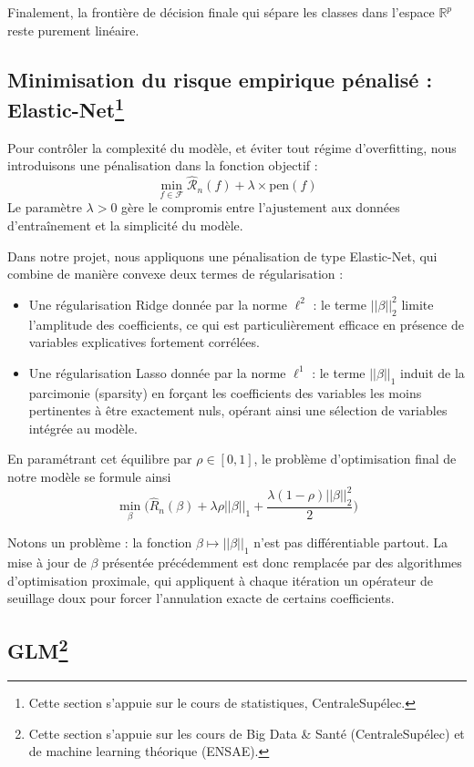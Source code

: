 \documentclass[a4paper,11pt]{paper}
\theoremstyle{plain}
\theoremstyle{definition}
\theoremstyle{remark}
\begin{document}
Finalement, la frontière de décision finale qui sépare les classes dans l'espace $\mathbb{R}^p$ reste purement linéaire.


\subsection{Minimisation du risque empirique pénalisé : Elastic-Net\texorpdfstring{\protect\footnote{Cette section s'appuie sur le cours de statistiques, CentraleSupélec.}}{}}

Pour contrôler la complexité du modèle, et éviter tout régime d'overfitting, nous introduisons une pénalisation dans la fonction objectif :
$$\min_{f \in \mathcal{F}} \hat{\mathcal{R}}_n(f) + \lambda \times \text{pen}(f)$$
Le paramètre $\lambda > 0$ gère le compromis entre l'ajustement aux données d'entraînement et la simplicité du modèle.

Dans notre projet, nous appliquons une pénalisation de type Elastic-Net, qui combine de manière convexe deux termes de régularisation :
\begin{itemize}
    \item Une régularisation Ridge donnée par la norme $\ell^2$ : le terme $||\beta||_2^2$ limite l'amplitude des coefficients, ce qui est particulièrement efficace en présence de variables explicatives fortement corrélées.
    \item Une régularisation Lasso donnée par la norme $\ell^1$ : le  terme $||\beta||_1$ induit de la parcimonie (sparsity) en forçant les coefficients des variables les moins pertinentes à être exactement nuls, opérant ainsi une sélection de variables intégrée au modèle.
\end{itemize}

En paramétrant cet équilibre par $\rho \in [0,1]$, le problème d'optimisation final de notre modèle se formule ainsi
$$\min_{\beta} \bigg( \hat R_n(\beta) + \lambda \rho ||\beta||_1 + \dfrac{\lambda (1- \rho)||\beta||_2^2}{2}\bigg)$$

Notons un problème : la fonction $\beta \mapsto ||\beta||_1$ n'est pas différentiable partout. La mise à jour de $\beta$ présentée précédemment est donc remplacée par des algorithmes d'optimisation proximale, qui appliquent à chaque itération un opérateur de seuillage doux pour forcer l'annulation exacte de certains coefficients.

\subsection{GLM\texorpdfstring{\protect\footnote{Cette section s'appuie sur les cours de Big Data \& Santé (CentraleSupélec) et de machine learning théorique (ENSAE).}}{}}
\end{document}
